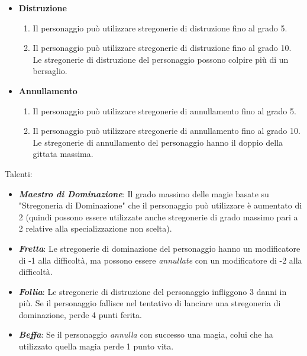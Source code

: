 \documentclass[../manuale_main.tex]{subfiles}
\begin{document}
\begin{itemize} 
\item\textbf{Distruzione}
\begin{enumerate}
\item Il personaggio può utilizzare stregonerie di distruzione fino al grado 5.
\item Il personaggio può utilizzare stregonerie di distruzione fino al grado 10. Le stregonerie di distruzione del personaggio possono colpire più di un bersaglio.

\end{enumerate}

\item\textbf{Annullamento}
\begin{enumerate}
\item Il personaggio può utilizzare stregonerie di annullamento fino al grado 5.
\item Il personaggio può utilizzare stregonerie di annullamento fino al grado 10. Le stregonerie di annullamento del personaggio hanno il doppio della gittata massima.

\end{enumerate}
\end{itemize}

Talenti:

\begin{itemize}
\item \textbf{\textit{Maestro di Dominazione}}: Il grado massimo delle magie basate su "Stregoneria di Dominazione" che il personaggio può utilizzare è aumentato di 2 (quindi possono essere utilizzate anche stregonerie di grado massimo pari a 2 relative alla specializzazione non scelta).
\item \textbf{\textit{Fretta}}: Le stregonerie di dominazione del personaggio hanno un modificatore di -1 alla difficoltà, ma possono essere \textit{annullate} con un modificatore di -2 alla difficoltà.
\item \textbf{\textit{Follia}}: Le stregonerie di distruzione del personaggio infliggono 3 danni in più. Se il personaggio fallisce nel tentativo di lanciare una stregoneria di dominazione, perde 4 punti ferita.
\item \textbf{\textit{Beffa}}: Se il personaggio \textit{annulla} con successo una magia, colui che ha utilizzato quella magia perde 1 punto vita.
\end{itemize}
\end{document}
